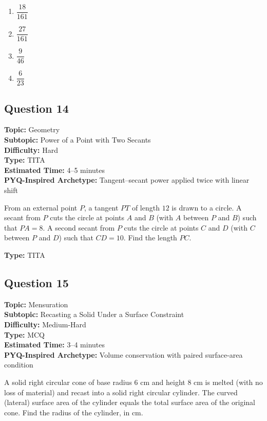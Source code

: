 \documentclass[11pt]{article}
\begin{document}
\begin{enumerate}[label=(\Alph*)]
    \item \(\dfrac{18}{161}\)
    \item \(\dfrac{27}{161}\)
    \item \(\dfrac{9}{46}\)
    \item \(\dfrac{6}{23}\)
\end{enumerate}

\subsection*{Question 14}

\textbf{Topic:} Geometry \\
\textbf{Subtopic:} Power of a Point with Two Secants \\
\textbf{Difficulty:} Hard \\
\textbf{Type:} TITA \\
\textbf{Estimated Time:} 4--5 minutes \\
\textbf{PYQ-Inspired Archetype:} Tangent--secant power applied twice with linear shift

\begin{tcolorbox}
From an external point \(P\), a tangent \(PT\) of length \(12\) is drawn to a circle. A secant from \(P\) cuts the circle at points \(A\) and \(B\) (with \(A\) between \(P\) and \(B\)) such that \(PA = 8\). A second secant from \(P\) cuts the circle at points \(C\) and \(D\) (with \(C\) between \(P\) and \(D\)) such that \(CD = 10\). Find the length \(PC\).
\end{tcolorbox}

\textbf{Type:} TITA

\subsection*{Question 15}

\textbf{Topic:} Mensuration \\
\textbf{Subtopic:} Recasting a Solid Under a Surface Constraint \\
\textbf{Difficulty:} Medium-Hard \\
\textbf{Type:} MCQ \\
\textbf{Estimated Time:} 3--4 minutes \\
\textbf{PYQ-Inspired Archetype:} Volume conservation with paired surface-area condition

\begin{tcolorbox}
A solid right circular cone of base radius \(6\) cm and height \(8\) cm is melted (with no loss of material) and recast into a solid right circular cylinder. The curved (lateral) surface area of the cylinder equals the total surface area of the original cone. Find the radius of the cylinder, in cm.
\end{tcolorbox}
\end{document}
